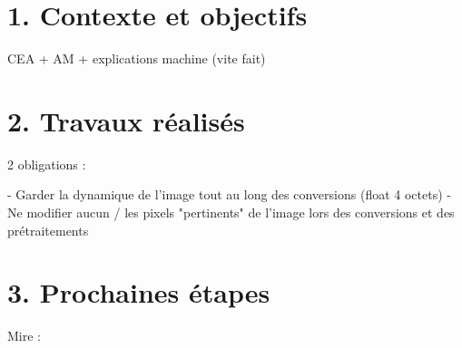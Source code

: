\documentclass[12pt,a4paper]{article}
\begin{document}
\section*{1. Contexte et objectifs}
CEA + AM + explications machine (vite fait)

\section*{2. Travaux réalisés}
2 obligations : 

	- Garder la dynamique de l'image tout au long des conversions (float 4 octets)
 	- Ne modifier aucun / les pixels "pertinents" de l'image lors des conversions et des prétraitements

\section*{3. Prochaines étapes}
Mire :
\end{document}
